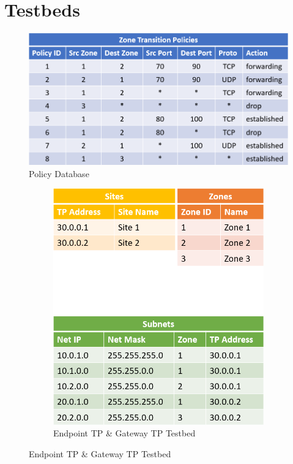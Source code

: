 \chapter{Testbeds}

\begin{figure}[h]
	\centering
	\includegraphics[width =.5\textwidth]{img/Policies.png}
	\caption{Policy Database}
	\label{Policy Database}
\end{figure}

\begin{figure}
    \centering
    \begin{subfigure}[t]{.49\textwidth}
      \centering
      \includegraphics[width=\linewidth]{img/Endpoint_TP_Testbed_Data.png}
      \caption{Endpoint \acs{TP} \& Gateway \acs{TP} Testbed}
      \label{fig:sub: Endpoint TP and Gateway TP Testbed}
    \end{subfigure}\hfill%

\end{figure}
